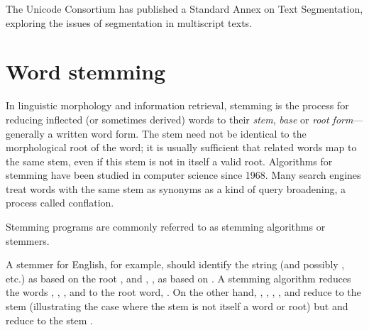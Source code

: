     The Unicode Consortium has published a Standard Annex\cite{Davis2012} on Text Segmentation, exploring the issues of segmentation in multiscript texts.
      

  \section{Word stemming}

    In linguistic morphology and information retrieval, stemming is the process for reducing inflected (or sometimes derived) words to their \emph{stem}, \emph{base} or \emph{root form}---generally a written word form. The stem need not be identical to the morphological root of the word; it is usually sufficient that related words map to the same stem, even if this stem is not in itself a valid root. Algorithms for stemming have been studied in computer science since 1968. Many search engines treat words with the same stem as synonyms as a kind of query broadening, a process called conflation.

    Stemming programs are commonly referred to as stemming algorithms or stemmers.      
    
    A stemmer for English, for example, should identify the string  (and possibly ,  etc.) as based on the root , and , ,  as based on . A stemming algorithm reduces the words , , , and  to the root word, . On the other hand, , , , , and  reduce to the stem  (illustrating the case where the stem is not itself a word or root) but  and  reduce to the stem .
    
